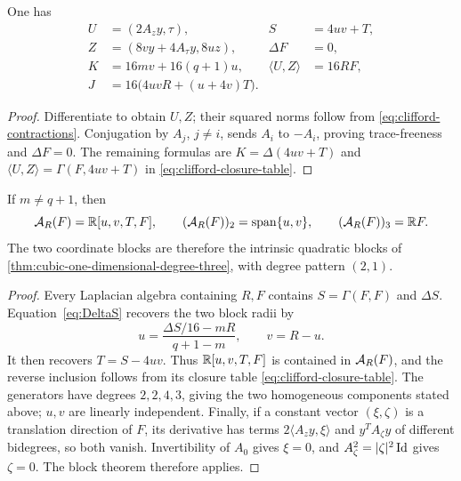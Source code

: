 \begin{proposition}
\label{prop:first-order}
One has
\begin{subequations}
\label{eq:U}\label{eq:S}\label{eq:Z}\label{eq:Clifford-gradS-square}
\label{eq:DeltaF}\label{eq:DeltaS}\label{eq:UZ}
\begin{equation}
\begin{aligned}
 U&=(2A_z y,\tau),& S&=4uv+T,\\
 Z&=(8vy+4A_\tau y,8uz),& \Delta F&=0,\\
 K&=16mv+16(q+1)u,& \langle U,Z\rangle&=16RF,\\
 J&=16\bigl(4uvR+(u+4v)T\bigr).
\end{aligned}
\tag{\theparentequation}
\end{equation}
\end{subequations}
\end{proposition}

\begin{proof}
Differentiate to obtain $U,Z$; their squared norms follow from
\eqref{eq:clifford-contractions}. Conjugation by $A_j$, $j\ne i$,
sends $A_i$ to $-A_i$, proving trace-freeness and $\Delta F=0$.
The remaining formulas are
$K=\Delta(4uv+T)$ and $\langle U,Z\rangle=\Gamma(F,4uv+T)$
in \eqref{eq:clifford-closure-table}.
\end{proof}


\begin{theorem}
\label{thm:clifford-minimal-algebra}
If \(m\ne q+1\), then
\[
 \mathcal A_R(F)=\mathbb R[u,v,T,F],\qquad
 (\mathcal A_R(F))_2=\operatorname{span}\{u,v\},\qquad
 (\mathcal A_R(F))_3=\mathbb R F.
\]
The two coordinate blocks are therefore the intrinsic quadratic
blocks of \cref{thm:cubic-one-dimensional-degree-three}, with degree
pattern \((2,1)\).
\end{theorem}

\begin{proof}
Every Laplacian algebra containing \(R,F\) contains
\(S=\Gamma(F,F)\) and \(\Delta S\). Equation~\eqref{eq:DeltaS}
recovers the two block radii by
\[
 u=\frac{\Delta S/16-mR}{q+1-m},\qquad v=R-u.
\]
It then recovers \(T=S-4uv\). Thus \(\mathbb R[u,v,T,F]\) is
contained in \(\mathcal A_R(F)\), and the reverse inclusion follows from
its closure table \eqref{eq:clifford-closure-table}. The generators
have degrees \(2,2,4,3\), giving the two homogeneous components
stated above; \(u,v\) are linearly independent.
Finally, if a constant vector \((\xi,\zeta)\) is a translation
direction of \(F\), its derivative has terms
\(2\langle A_z y,\xi\rangle\) and \(y^TA_\zeta y\) of
different bidegrees, so both vanish. Invertibility of \(A_0\)
gives \(\xi=0\), and \(A_\zeta^2=|\zeta|^2\operatorname{Id}\) gives
\(\zeta=0\). The block theorem therefore applies.
\end{proof}

